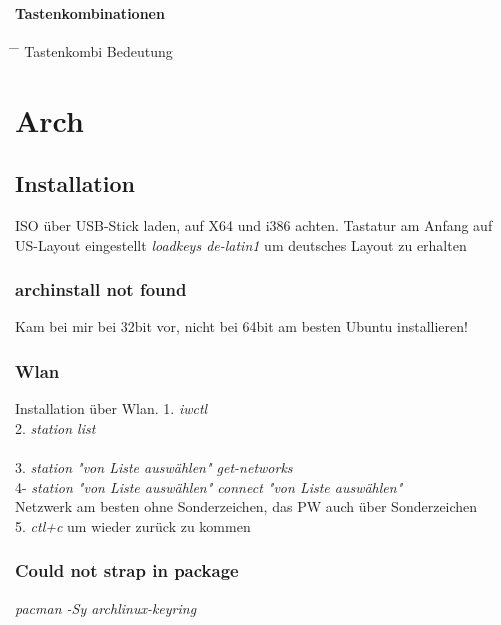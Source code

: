 \documentclass[10pt,a4paper,twoside]{book}
\begin{document}
\subsubsection{Tastenkombinationen}
\begin{tabbing}
\hspace*{1mm} \=\hspace*{30mm} \= \kill
\> Tastenkombi \> Bedeutung  \\
\end{tabbing}
\chapter{Arch}
\section{Installation}
ISO über USB-Stick laden, auf X64 und i386 achten.
Tastatur am Anfang auf US-Layout eingestellt
\textit{loadkeys de-latin1} um deutsches Layout zu erhalten
\subsection{archinstall not found}
Kam bei mir bei 32bit vor, nicht bei 64bit
am besten Ubuntu installieren!
\subsection{Wlan}
Installation über Wlan.
1. \textit{iwctl} \\
2. \textit{station list}\\ \\
3. \textit{station "von Liste auswählen" get-networks}\\
4- \textit{station "von Liste auswählen" connect "von Liste auswählen"}\\
\hspace*{3 mm} Netzwerk am besten ohne Sonderzeichen, das PW auch über Sonderzeichen\\
5. \textit{ctl+c} um wieder zurück zu kommen\\
\subsection{Could not strap in package}
\textit{pacman -Sy archlinux-keyring}\\
\end{document}
